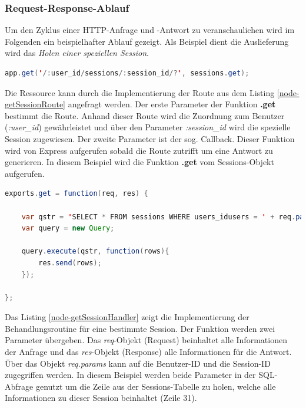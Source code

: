 \subsubsection{Request-Response-Ablauf \label{sec:req-res-cycle}}

Um den Zyklus einer HTTP-Anfrage und -Antwort zu veranschaulichen wird im Folgenden ein beispielhafter Ablauf gezeigt. Als Beispiel dient die Auslieferung wird das \emph{Holen einer speziellen Session}.  

\begin{lstlisting}[label=node-getSessionRoute,language=Java, caption=Routenlistener für eine spezielle Session, firstnumber=169] 
app.get('/:user_id/sessions/:session_id/?', sessions.get);
\end{lstlisting}

Die Ressource kann durch die Implementierung der Route aus dem Listing \ref{node-getSessionRoute} angefragt werden. Der erste Parameter der Funktion \textbf{.get} bestimmt die Route. Anhand dieser Route wird die Zuordnung zum Benutzer (\emph{:user\_id}) gewährleistet und über den Parameter \emph{:session\_id} wird die spezielle Session zugewiesen. Der zweite Parameter ist der sog. Callback. Dieser Funktion wird von Express aufgerufen sobald die Route zutrifft um eine Antwort zu generieren. In diesem Beispiel wird die Funktion \textbf{.get} vom Sessions-Objekt aufgerufen.

\begin{lstlisting}[label=node-getSessionHandler,language=Java, caption=Routenbehandlung für eine spezielle Session, firstnumber=29]
exports.get = function(req, res) {
	
	var qstr = 'SELECT * FROM sessions WHERE users_idusers = ' + req.params.user_id + ' AND idsessions = ' + req.params.session_id;
	var query = new Query;
	
	query.execute(qstr, function(rows){
		res.send(rows);
	});
	
};
\end{lstlisting}

Das Listing \ref{node-getSessionHandler} zeigt die Implementierung der Behandlungsroutine für eine bestimmte Session. Der Funktion werden zwei Parameter übergeben. Das \emph{req}-Objekt (Request) beinhaltet alle Informationen der Anfrage und das \emph{res}-Objekt (Response) alle Informationen für die Antwort. Über das Objekt \emph{req.params} kann auf die Benutzer-ID und die Session-ID zugegriffen werden. In diesem Beispiel werden beide Parameter in der SQL-Abfrage genutzt um die Zeile aus der Sessions-Tabelle zu holen, welche alle Informationen zu dieser Session beinhaltet (Zeile 31). 

